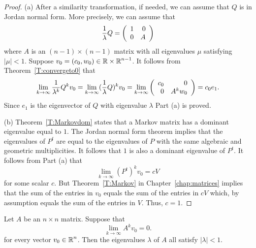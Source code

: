 \documentclass{ximera}
\begin{document}
\begin{proof}  (a) After a similarity transformation, if needed, 
we can assume that $Q$ is in 
Jordan normal form.  More precisely, we can assume that 
\[
\frac{1}{\lambda}Q = \left(\begin{array}{rr} 1 & 0\\ 0 &A\end{array}\right)
\]
where $A$ is an $(n-1)\times (n-1)$ matrix with all eigenvalues $\mu$
satisfying $|\mu|<1$.  Suppose $v_0=(c_0,w_0)\in\mbox{$\Bbb{R}$}\times\mbox{$\Bbb{R}$}^{n-1}$.  It 
follows from Theorem~\ref{T:convergeto0} that 
\[
\lim_{k\to\infty}\frac{1}{\lambda^k}Q^kv_0 = 
\lim_{k\to\infty}(\frac{1}{\lambda}Q)^kv_0 =
\lim_{k\to\infty}\left(\begin{array}{rr} c_0 & 0\\ 0 &A^kw_0\end{array}\right) = c_0e_1.
\]
Since $e_1$ is the eigenvector of $Q$ with eigenvalue $\lambda$ Part (a) 
is proved.

(b)   Theorem~\ref{T:Markovdom} states that a Markov matrix has a dominant 
eigenvalue equal to $1$.  The Jordan normal form theorem implies that the 
eigenvalues of $P^t$ are equal to the eigenvalues of $P$ with the same 
algebraic and geometric multiplicities.  It follows that $1$ is also a 
dominant eigenvalue of $P^t$.  It follows from Part (a) that
\[
\lim_{k\to\infty}(P^t)^kv_0 = cV
\]
for some scalar $c$.  But Theorem~\ref{T:Markov} in 
Chapter~\ref{chap:matrices} implies that the sum of the
entries in $v_0$ equals the sum of the entries in $cV$ which, by assumption
equals the sum of the entries in $V$.  Thus, $c=1$.   \end{proof}





\EXER

\TEXER

\begin{exercise} \label{c10.6.1}
Let $A$ be an $n\times n$ matrix.   Suppose that 
\[
\lim_{k\to\infty} A^kv_0 = 0.
\]
for every vector $v_0\in\mbox{$\Bbb{R}$}^n$.  Then the eigenvalues $\lambda$ of $A$ all
satisfy $|\lambda|<1$.
\end{exercise}
\end{document}

